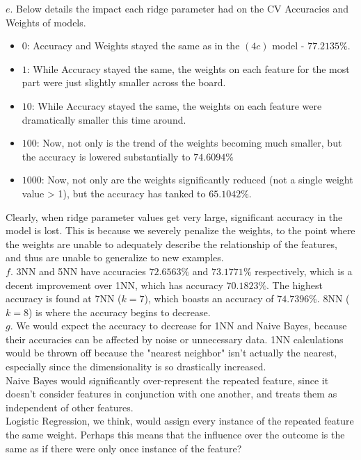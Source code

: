 \documentclass[11pt]{article}
\begin{document}
\noindent $e.$ Below details the impact each ridge parameter had on the CV Accuracies and Weights of models.
\begin{itemize}
\item $0$: Accuracy and Weights stayed the same as in the $(4c)$ model - $77.2135\%$.
\item $1$: While Accuracy stayed the same, the weights on each feature for the most part were just slightly smaller across the board.
\item $10$: While Accuracy stayed the same, the weights on each feature were dramatically smaller this time around.
\item $100$: Now, not only is the trend of the weights becoming much smaller, but the accuracy is lowered substantially to $74.6094\%$
\item $1000$: Now, not only are the weights significantly reduced (not a single weight value > 1), but the accuracy has tanked to $65.1042\%$. 
\end{itemize}

Clearly, when ridge parameter values get very large, significant accuracy in the model is lost. This is because we severely penalize the weights, to the point where the weights are unable to adequately describe the relationship of the features, and thus are unable to generalize to new examples.\\

\noindent $f.$ 3NN and 5NN have accuracies $72.6563\%$ and $73.1771\%$ respectively, which is a decent improvement over 1NN, which has accuracy $70.1823\%$. The highest accuracy is found at 7NN ($k = 7$), which boasts an accuracy of $74.7396\%$. 8NN ($k = 8$) is where the accuracy begins to decrease.\\

\noindent $g.$ We would expect the accuracy to decrease for 1NN and Naive Bayes, because their accuracies can be affected by noise or unnecessary data. 1NN calculations would be thrown off because the "nearest neighbor" isn't actually the nearest, especially since the dimensionality is so drastically increased.\\

\noindent Naive Bayes would significantly over-represent the repeated feature, since it doesn't consider features in conjunction with one another, and treats them as independent of other features.\\

\noindent Logistic Regression, we think, would assign every instance of the repeated feature the same weight. Perhaps this means that the influence over the outcome is the same as if there were only once instance of the feature?\\
\end{document}
